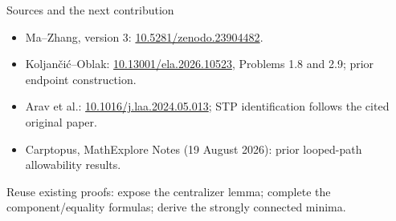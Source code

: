 \documentclass{beamer}
\begin{document}
\begin{frame}{Sources and the next contribution}
\small
\begin{itemize}
\item Ma--Zhang, version 3: \href{https://doi.org/10.5281/zenodo.23904482}{10.5281/zenodo.23904482}.
\item Koljančić--Oblak: \href{https://doi.org/10.13001/ela.2026.10523}{10.13001/ela.2026.10523}, Problems 1.8 and 2.9; prior endpoint construction.
\item Arav et al.: \href{https://doi.org/10.1016/j.laa.2024.05.013}{10.1016/j.laa.2024.05.013}; STP identification follows the cited original paper.
\item Carptopus, MathExplore Notes (19 August 2026): prior looped-path allowability results.
\end{itemize}
\normalsize Reuse existing proofs: expose the centralizer lemma; complete the component/equality formulas; derive the strongly connected minima.
\end{frame}
\appendix
\end{document}
